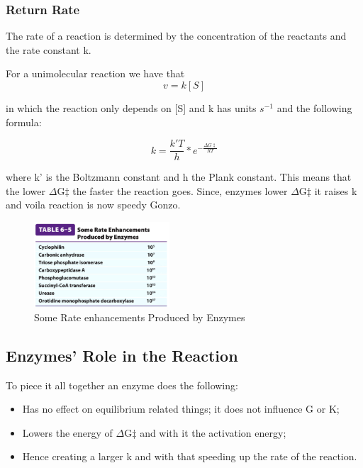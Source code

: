 \documentclass[../main.tex]{subfiles}
\begin{document}
\subsubsection{\gls{Return Rate}}
The rate of a reaction is determined by the concentration of the reactants and the rate constant k.

For a unimolecular reaction we have that
\begin{equation}
	v = k[S]
\end{equation}

in which the reaction only depends on [S] and k has units $s^{-1}$ and the following formula:

\begin{equation}
	k = \frac{k'T}{h} * e^{-\frac{\Delta G \ddagger}{RT}}
\end{equation}

where k' is the Boltzmann constant and h the Plank constant. This means that the lower $\Delta$G$\ddagger$ the faster the reaction goes. Since, enzymes lower $\Delta$G$\ddagger$ it raises k and voila reaction is now speedy Gonzo.

\begin{figure}[h]
	\centering
	\includegraphics[width=0.45\textwidth]{Enzymes_speedo}
	\caption{Some Rate enhancements Produced by Enzymes}
\end{figure}

\subsection{Enzymes' Role in the Reaction}

To piece it all together an enzyme does the following:
\begin{itemize}
	\item Has no effect on equilibrium related things; it does not influence G or K;
	\item Lowers the energy of $\Delta$G$\ddagger$ and with it the activation energy;
	\item Hence creating a larger k and with that speeding up the rate of the reaction.
\end{itemize}
\end{document}
